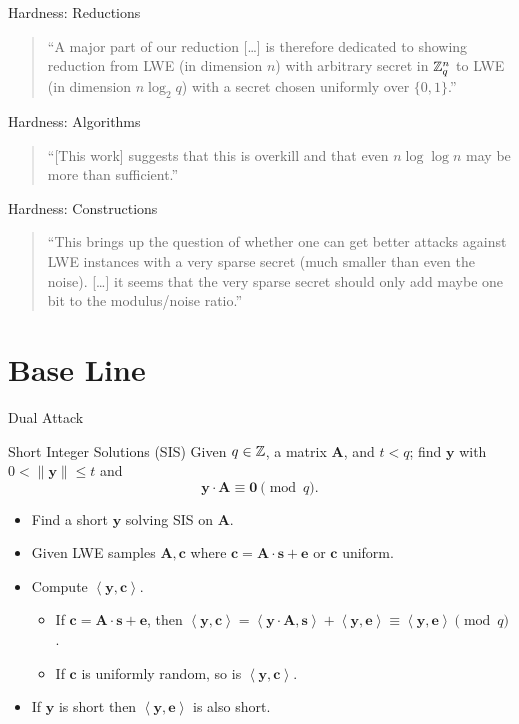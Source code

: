 \documentclass[presentation,smaller]{beamer}
\newcommand{\ZZ}[1][blank]{\ensuremath{\ifthenelse{\equal{#1}{blank}}{\mathbb{Z}}{\mathbb{Z}\left[#1\right]}\xspace}}
\newcommand{\ZZq}[1][blank]{\ensuremath{\ifthenelse{\equal{#1}{blank}}{\mathbb{Z}_q}{\mathbb{Z}_q\left[#1\right]}\xspace}}
\renewcommand{\vec}[1]{\ensuremath{\mathbf{#1}}\xspace}
\newcommand{\ip}[2]{\ensuremath{\left\langle {#1},{#2}\right\rangle}\xspace}
\begin{document}
\begin{frame}[label={sec:org6c6ef8c}]{Hardness: Reductions}
\begin{quote}
“A major part of our reduction [\dots{}] is therefore dedicated to showing  reduction from LWE (in dimension \(n\)) with arbitrary secret in \(\ZZq^n\) to LWE (in dimension \alert{\(n \log_2 q\)}) with a secret chosen uniformly over \(\{0, 1\}\).” 
\end{quote}
\end{frame}

\begin{frame}[label={sec:org538c225}]{Hardness: Algorithms}
\begin{quote}
“[This work] suggests that this is overkill and that even \alert{\(n\log\log n\)} may be more than sufficient.”
\end{quote}
\end{frame}

\begin{frame}[label={sec:org828e1f6}]{Hardness: Constructions}
\begin{quote}
“This brings up the question of whether one can get better attacks against LWE instances with a very sparse secret (much smaller than even the noise). [\dots{}] it seems that the very sparse secret should only add maybe \alert{one bit to the modulus/noise ratio}.” 
\end{quote}
\end{frame}

\section{Base Line}
\label{sec:orga91647d}
\begin{frame}[label={sec:orgd3f494f}]{Dual Attack}
\begin{block}{Short Integer Solutions (SIS)}
Given \(q \in \ZZ\), a matrix \(\vec{A}\), and \(t < q\); find \(\vec{y}\) with \(0 < \| \vec{y} \| \leq t\) and \[\vec{y} ⋅ \vec{A} ≡ \vec{0} \pmod{q}.\]
\end{block}

\begin{itemize}
\item Find a short \(\vec{y}\) solving SIS on \(\vec{A}\).
\item Given LWE samples \(\vec{A}, \vec{c}\) where \(\vec{c} = \vec{A}⋅\vec{s} + \vec{e}\) or \(\vec{c}\) uniform.
\item Compute \(\ip{\vec{y}}{\vec{c}}\).
\begin{itemize}
\item If \(\vec{c} = \vec{A}⋅\vec{s} + \vec{e}\), then \(\ip{\vec{y}}{\vec{c}} = \ip{\vec{y}⋅\vec{A}}{\vec{s}} + \ip{\vec{y}}{\vec{e}} \equiv \ip{\vec{y}}{\vec{e}} \pmod{q}\).
\item If \(\vec{c}\) is uniformly random, so is \(\ip{\vec{y}}{\vec{c}}\).
\end{itemize}
\item If \(\vec{y}\) is short then \(\ip{\vec{y}}{\vec{e}}\) is also short.
\end{itemize}
\end{frame}
\end{document}
